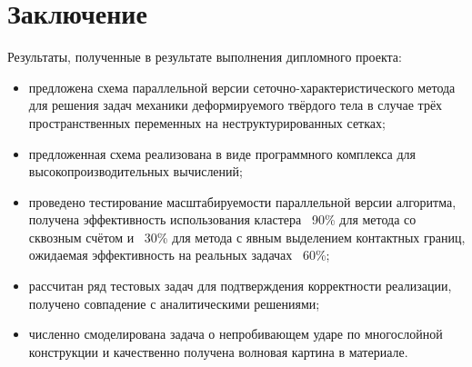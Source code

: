 \section{Заключение}
Результаты, полученные в результате выполнения дипломного проекта:
\begin{itemize}
\item предложена схема параллельной версии сеточно-характеристического метода для решения задач механики деформируемого твёрдого тела в случае трёх пространственных переменных на неструктурированных сетках;
\item предложенная схема реализована в виде программного комплекса для высокопроизводительных вычислений;
\item проведено тестирование масштабируемости параллельной версии алгоритма, получена эффективность использования кластера ~90\% для метода со сквозным счётом и ~30\% для метода с явным выделением контактных границ, ожидаемая эффективность на реальных задачах ~60\%;
\item рассчитан ряд тестовых задач для подтверждения корректности реализации, получено совпадение с аналитическими решениями;
\item численно смоделирована задача о непробивающем ударе по многослойной конструкции и качественно получена волновая картина в материале.
\end{itemize}
